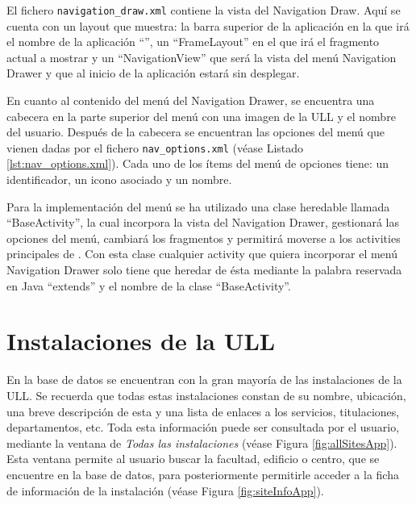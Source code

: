 El fichero \texttt{navigation\_draw.xml} contiene la vista del Navigation Draw. Aquí se cuenta con un layout que muestra: la barra superior de la aplicación en la que irá el nombre de la aplicación ``\ULLAR{}'', un ``FrameLayout'' en el que irá el fragmento actual a mostrar y un ``NavigationView'' que será la vista del menú Navigation Drawer y que al inicio de la aplicación estará sin desplegar.

En cuanto al contenido del menú del Navigation Drawer, se encuentra una cabecera en la parte superior del menú con una imagen de la ULL y el nombre del usuario. Después de la cabecera se encuentran las opciones del menú que vienen dadas por el fichero \texttt{nav\_options.xml} (véase Listado \ref{lst:nav_options.xml}). Cada uno de los ítems del menú de opciones tiene: un identificador, un icono asociado y un nombre.

\bigskip
\bigskip
\bigskip




% 
   
\bigskip



Para la implementación del menú se ha utilizado una clase heredable llamada ``BaseActivity'', la cual incorpora la vista del Navigation Drawer, gestionará las opciones del menú, cambiará los fragmentos y permitirá moverse a los activities principales de \ULLAR{}. 
Con esta clase cualquier activity que quiera incorporar el menú Navigation Drawer 
solo tiene que heredar de ésta mediante la palabra reservada en Java ``extends'' y el nombre de la clase ``BaseActivity''.
        
\section{Instalaciones de la ULL}

En la base de datos se encuentran con la gran mayoría de las instalaciones de la ULL. Se recuerda que todas estas instalaciones constan de su nombre, ubicación, una breve descripción de esta y una lista de enlaces a los servicios, titulaciones, departamentos, etc. Toda esta información puede ser consultada por el usuario, mediante la ventana de \textit{Todas las instalaciones} (véase Figura \ref{fig:allSitesApp}). Esta ventana permite al usuario buscar la facultad, edificio o centro, que se encuentre en la base de datos, para posteriormente permitirle acceder a la ficha de información de la instalación (véase Figura \ref{fig:siteInfoApp}). 


